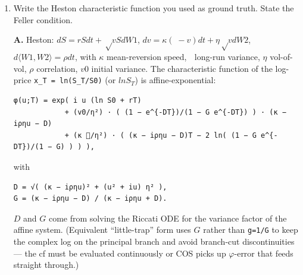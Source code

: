 \documentclass[
  11pt,
]{article}
\providecommand{\tightlist}{%
  \setlength{\itemsep}{0pt}\setlength{\parskip}{0pt}}
\begin{document}
\begin{enumerate}
  The rate in \(N\) is set by the \textbf{smoothness of \(f\)}:

  \begin{itemize}
  \tightlist
  \item
    \(f\) analytic in a strip / \(f∈C^∞\) with integrable derivatives ⇒
    \(A_k\) decay \textbf{exponentially} ⇒ \textbf{exponential}
    convergence in \(N\) (machine precision in dozens--low hundreds of
    terms).
  \item
    \(f\) with only \(β\) integrable derivatives ⇒
    \(A_k = O(k^{-(β+1)})\) ⇒ only \textbf{algebraic} convergence.
    \emph{Lack of smoothness is what kills the exponential rate.}
  \end{itemize}

  \textbf{Algebraic case:} a low-regularity density ---
  e.g.~Variance-Gamma with small \(ν\) (the density develops a
  non-smooth peak / cusp), or a short-dated density approaching a Dirac,
  or near a jump/kink. There \(A_k\) decay only polynomially and you
  need many more terms.
\item
  Write the Heston characteristic function you used as ground truth.
  State the Feller condition.

  \textbf{A.} Heston: \(dS = rS dt + √v S dW1\),
  \(dv = κ( − v)dt + η√v dW2\), \(d⟨W1,W2⟩ = ρ dt\), with \(κ\)
  mean-reversion speed, \(\) long-run variance, \(η\) vol-of-vol, \(ρ\)
  correlation, \(v0\) initial variance. The characteristic function of
  the log-price \texttt{x\_T\ =\ ln(S\_T/S0)} (or \(ln S_T\)) is
  affine-exponential:

\begin{verbatim}
φ(u;T) = exp( i u (ln S0 + rT)
            + (v0/η²) · ( (1 − e^{-DT})/(1 − G e^{-DT}) ) · (κ − iρηu − D)
            + (κ /η²) · ( (κ − iρηu − D)T − 2 ln( (1 − G e^{-DT})/(1 − G) ) ) ),
\end{verbatim}

  with

\begin{verbatim}
D = √( (κ − iρηu)² + (u² + iu) η² ),
G = (κ − iρηu − D) / (κ − iρηu + D).
\end{verbatim}

  \(D\) and \(G\) come from solving the Riccati ODE for the variance
  factor of the affine system. (Equivalent ``little-trap'' form uses
  \(G\) rather than \texttt{g=1/G} to keep the complex log on the
  principal branch and avoid branch-cut discontinuities --- the cf must
  be evaluated continuously or COS picks up \(φ\)-error that feeds
  straight through.)


\end{enumerate}
\end{document}
